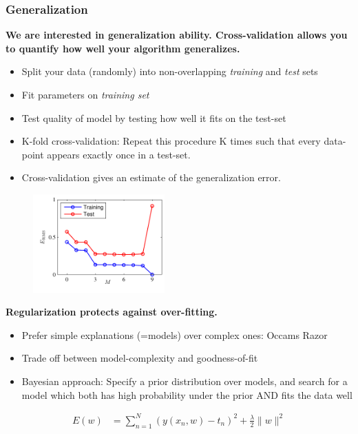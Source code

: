 \subsubsection{Generalization}
\textbf{We are interested in generalization ability. Cross-validation allows you to
quantify how well your algorithm generalizes.}\\
\begin{itemize}
	\item Split your data (randomly) into non-overlapping \textit{training} and \textit{test} sets
    \item Fit parameters on \textit{training set}
    \item Test quality of model by testing how well it fits on the test-set
    \item K-fold cross-validation: Repeat this procedure K times such that every data-point appears exactly once in a test-set.
    \item Cross-validation gives an estimate of the generalization error.
\end{itemize}

\begin{figure}
	\centering
	\includegraphics[width=0.45\textwidth]{./lecture1/Figure1_5}
\end{figure}

\textbf{Regularization protects against over-fitting.}\
\begin{itemize}
 \item Prefer simple explanations (=models) over complex ones: Occams Razor
 \item Trade off between model-complexity and goodness-of-fit
 \item Bayesian approach: Specify a prior distribution over models, and search for a model which both has high probability under the prior AND fits the data well
\end{itemize}

\begin{align*}
	E(w) &= \sum_{n=1}^N (y(x_n, w) - t_n)^2 + \frac{\lambda}{2} \|w\|^2
\end{align*}

